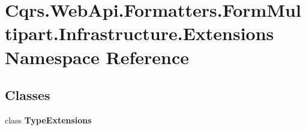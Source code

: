 \hypertarget{namespaceCqrs_1_1WebApi_1_1Formatters_1_1FormMultipart_1_1Infrastructure_1_1Extensions}{}\section{Cqrs.\+Web\+Api.\+Formatters.\+Form\+Multipart.\+Infrastructure.\+Extensions Namespace Reference}
\label{namespaceCqrs_1_1WebApi_1_1Formatters_1_1FormMultipart_1_1Infrastructure_1_1Extensions}
\subsection*{Classes}
\begin{DoxyCompactItemize}
\item 
class {\bfseries Type\+Extensions}
\end{DoxyCompactItemize}
